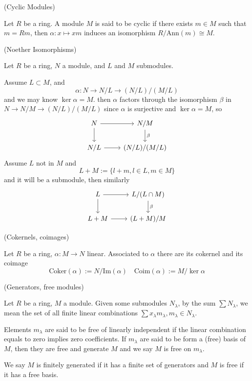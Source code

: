 \documentclass{article}
\begin{document}
\begin{definition}
    (Cyclic Modules)\par
    Let $R$ be a ring. A module $M$ is said to be cyclic if there exists $m\in M$ such that $m = Rm$, then $\alpha:x\mapsto xm$ induces an isomorphism $R/\text{Ann}(m) \cong M$.
\end{definition}

\begin{definition}
    (Noether Isomorphisms)\par
    Let $R$ be a ring, $N$ a module, and $L$ and $M$ submodules.\par
    Assume $L\subset M$, and
    \[
    \alpha:N\to N/L \to (N/L)/(M/L)
    \]
    and we may know $\ker \alpha = M$. then $\alpha$ factors through the isomorphism $\beta$ in $N\to N/M \to (N/L)/(M/L)$ since $\alpha$ is surjective and $\ker\alpha = M$, so
    \[
    \begin{tikzcd}
        N\arrow[r]\arrow[d] & N/M\arrow[d,"\beta"] \\
        N/L\arrow[r] & (N/L)/(M/L) 
    \end{tikzcd}
    \]
    Assume $L$ not in $M$ and
    \[
    L+M:=\{l+m, l\in  L, m\in M\}
    \]
    and it will be a submodule, then similarly
    \[
    \begin{tikzcd}
        L\arrow[r]\arrow[d] & L/(L\cap M)\arrow[d,"\beta"] \\
        L+M\arrow[r] & (L+M)/M 
    \end{tikzcd}
    \]
 \end{definition}

\begin{definition}
    (Cokernels, coimages)\par
    Let $R$ be a ring, $\alpha:M\to N$ linear. Associated to $\alpha$ there are its cokernel and its coimage
    \[
    \text{Coker}(\alpha) := N/\text{Im}(\alpha)\quad \text{Coim}(\alpha):= M/\ker{\alpha}
    \]
\end{definition}

\begin{definition}
    (Generators, free modules)\par
    Let $R$ be a ring, $M$ a module. Given some submodules $N_{\lambda}$, by the sum $\sum N_{\lambda}$, we mean the set of all finite linear combinations $\sum x_{\lambda}m_{\lambda}, m_{\lambda} \in N_{\lambda}$.\par
    Elements $m_{\lambda}$ are said to be free of linearly independent if the linear combination equals to zero implies zero coefficients. If $m_{\lambda}$ are said to be form a (free) basis of $M$, then they are free and generate $M$ and we say $M$ is free on $m_{\lambda}$.\par
    We say $M$ is finitely generated if it has a finite set of generators and $M$ is free if it has a free basis.
\end{definition}
\end{document}
